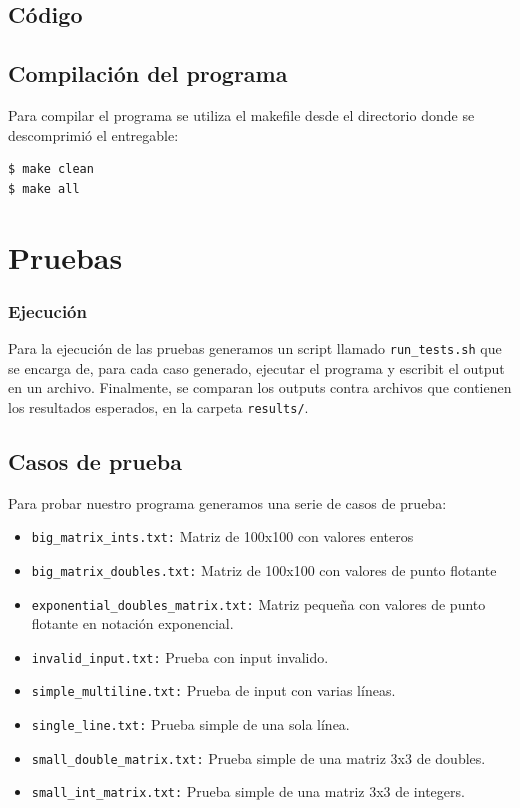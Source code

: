 \documentclass[a4paper,10pt, spanish]{article}
\begin{document}
\subsection{Código}




\lstset{
  language=bash,
  basicstyle=\small\ttfamily
}

\subsection{Compilación del programa}
Para compilar el programa se utiliza el makefile desde el directorio donde se descomprimió el entregable:
\begin{lstlisting}
$ make clean
$ make all
\end{lstlisting}

\section{Pruebas}

\subsubsection{Ejecución}

Para la ejecución de las pruebas generamos un script llamado \lstinline{run_tests.sh} que se encarga de, para cada caso generado, ejecutar el programa y escribit el output en un archivo.
Finalmente, se comparan los outputs contra archivos que contienen los resultados esperados, en la carpeta \lstinline{results/}.

\subsection{Casos de prueba}

Para probar nuestro programa generamos una serie de casos de prueba:

\begin{itemize}
  \item \lstinline{big_matrix_ints.txt:} Matriz de 100x100 con valores enteros
	\item \lstinline{big_matrix_doubles.txt:} Matriz de 100x100 con valores de punto flotante
  \item \lstinline{exponential_doubles_matrix.txt:} Matriz pequeña con valores de punto flotante en notación exponencial.
  \item \lstinline{invalid_input.txt:} Prueba con input invalido.
  \item \lstinline{simple_multiline.txt:} Prueba de input con varias líneas.
  \item \lstinline{single_line.txt:} Prueba simple de una sola línea.
  \item \lstinline{small_double_matrix.txt:} Prueba simple de una matriz 3x3 de doubles.
  \item \lstinline{small_int_matrix.txt:} Prueba simple de una matriz 3x3 de integers.
\end{itemize}
\end{document}
